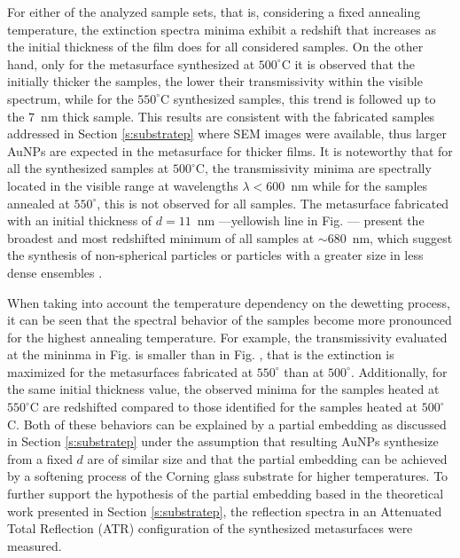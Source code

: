 For either of the analyzed sample sets, that is, considering a fixed annealing temperature, the extinction spectra minima exhibit a redshift that increases as the initial thickness of the film does  for all considered samples. On the other hand, only for the metasurface synthesized at $500^\circ$C it is observed that the initially thicker the samples, the lower their transmissivity within the visible spectrum, while for the $550^\circ$C synthesized samples, this trend is followed up to the $7$~nm thick sample. This results are consistent with the fabricated samples addressed in Section  \ref{s:substratep} where SEM images were available, thus larger AuNPs are expected in the metasurface for thicker films. It is noteworthy that for all the synthesized samples at $500^\circ$C, the transmissivity minima are spectrally located in the visible range at wavelengths $\lambda < 600$~nm while for the samples annealed at $550^\circ$, this is not observed for all samples. The metasurface fabricated with an initial thickness of $d = 11$~nm ---yellowish line in Fig. --- present the broadest and most redshifted minimum of all samples at $\sim 680$~nm, which  suggest the synthesis of non-spherical particles \cite{cuanalo_phase_2024} or particles with a greater size in less dense ensembles \cite{thompson_solid-state_2012}.

When taking into account the temperature dependency on the dewetting process, it can be seen that the spectral behavior of the samples become more pronounced for the highest annealing temperature. For example, the transmissivity evaluated at the mininma in Fig.  is smaller than  in  Fig. , that is the extinction is maximized for the metasurfaces fabricated at $550^\circ$ than at $500^\circ$. Additionally, for the same initial thickness value, the observed minima for the samples heated at $550^\circ$C are redshifted compared to those identified for the samples heated at $500^\circ$C. Both of these behaviors can be explained by a partial embedding as discussed in Section \ref{s:substratep} under the assumption that resulting AuNPs synthesize from a fixed $d$ are of similar size and that the partial embedding can be achieved by a softening process of the  Corning glass substrate  for higher temperatures. To further support the hypothesis of the partial embedding based in the theoretical work presented in Section \ref{s:substratep}, the reflection spectra  in an Attenuated Total Reflection (ATR) configuration of the synthesized metasurfaces were measured.

